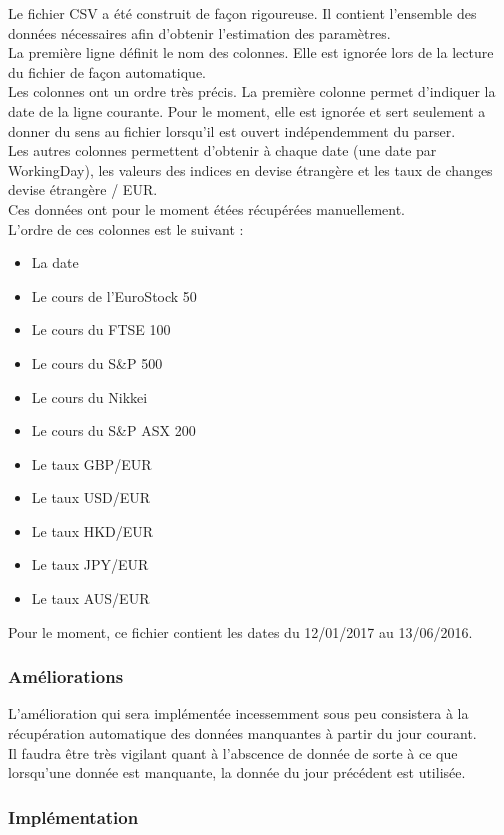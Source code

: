 \documentclass[a4paper,12pt]{article}
\begin{document}
Le fichier CSV a été construit de façon rigoureuse. Il contient l'ensemble des données nécessaires afin d'obtenir l'estimation des paramètres. \\ 
La première ligne définit le nom des colonnes. Elle est ignorée lors de la lecture du fichier de façon automatique. \\ 
Les colonnes ont un ordre très précis. La première colonne permet d'indiquer la date de la ligne courante. Pour le moment, elle est ignorée et sert seulement a donner du sens au fichier lorsqu'il est ouvert indépendemment du parser. \\ 
Les autres colonnes permettent d'obtenir à chaque date (une date par WorkingDay), les valeurs des indices en devise étrangère et les taux de changes devise étrangère / EUR. \\ 
Ces données ont pour le moment étées récupérées manuellement. \\ 
L'ordre de ces colonnes est le suivant :
\begin{itemize}
    \item La date
    \item Le cours de l'EuroStock 50
    \item Le cours du FTSE 100
    \item Le cours du S\&P 500
    \item Le cours du Nikkei 
    \item Le cours du S\&P ASX 200
    \item Le taux GBP/EUR
    \item Le taux USD/EUR
    \item Le taux HKD/EUR
    \item Le taux JPY/EUR 
    \item Le taux AUS/EUR
\end{itemize}

Pour le moment, ce fichier contient les dates du 12/01/2017 au 13/06/2016. 
\subsubsection{Améliorations}

L'amélioration qui sera implémentée incessemment sous peu consistera à la récupération automatique des données manquantes à partir du jour courant. \\ 
Il faudra être très vigilant quant à l'abscence de donnée de sorte à ce que lorsqu'une donnée est manquante, la donnée du jour précédent est utilisée.


\subsubsection{Implémentation}
\end{document}
